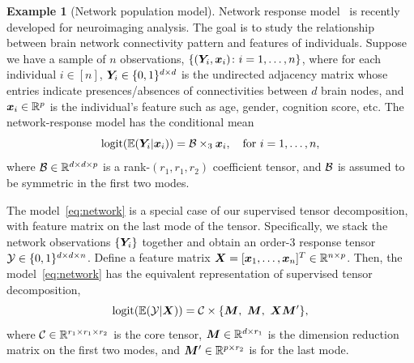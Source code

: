 \documentclass[12pt]{article}
\theoremstyle{definition}
\theoremstyle{definition}
\newtheorem{example}{Example}
\begin{document}
\begin{example}[Network population model]\label{example:brain}
Network response model~\citep{rabusseau2016low} is recently developed for neuroimaging analysis. The goal is to study the relationship between brain network connectivity pattern and features of individuals. Suppose we have a sample of $n$ observations, $\{(\bm Y_i, \bm x_i)\colon i=1,\ldots,n\}$, where for each individual $i\in[n]$, $\bm Y_i\in\{0,1\}^{d\times d}$ is the undirected adjacency matrix whose entries indicate presences/absences of connectivities between $d$ brain nodes, and $\bm x_i\in\mathbb{R}^p$ is the individual's feature such as age, gender, cognition score, etc. The network-response model  has the conditional mean
\begin{equation}\label{eq:network}
\textup{logit}(\mathbb{E}(\bm Y_i|\bm x_i))=\mathcal{B}\times_3\bm x_i, \quad \text{for }i=1,\ldots,n,
\end{equation}
where $\mathcal{B}\in \mathbb{R}^{d\times d\times p}$ is a rank-$(r_1,r_1,r_2)$ coefficient tensor, and $\mathcal{B}$ is assumed to be symmetric in the first two modes.  

The model~\eqref{eq:network} is a special case of our supervised tensor decomposition, with feature matrix on the last mode of the tensor. Specifically, we stack the network observations $\{\bm Y_i\}$ together and obtain an order-3 response tensor $\mathcal{Y}\in\{0,1\}^{d\times d\times n}$. Define a feature matrix $\bm X=[\bm x_1,\ldots,\bm x_n]^T\in\mathbb{R}^{n\times p}$. Then, the model~\eqref{eq:network} has the equivalent representation of supervised tensor decomposition,
\[
\textup{logit}(\mathbb{E}(\tY|\mX))=\tC\times\{\mM,\ \mM,\ \mX\mM'\},
\]
where $\mathcal{C}\in\mathbb{R}^{r_1\times r_1\times r_2}$ is the core tensor, $\bm M\in\mathbb{R}^{d\times r_1}$ is the dimension reduction matrix on the first two modes, and $\bm M'\in\mathbb{R}^{p\times r_2}$ is for the last mode.  \end{example}
 
\end{document}
